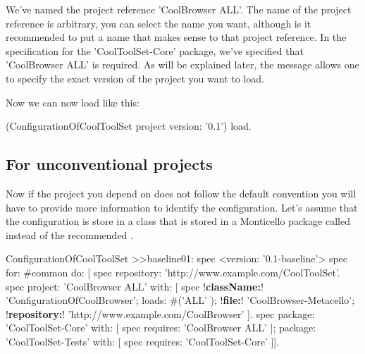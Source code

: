 \documentclass[a4paper,10pt,twoside]{book}
\begin{document}
We've named the project reference 'CoolBrowser ALL'. The name of the project reference is arbitrary, you can select the name you want, although is it recommended to put a name that makes sense to that project reference.  In the specification for the 'CoolToolSet-Core' package, we've specified that 'CoolBrowser ALL' is required. As will be explained later, the message  allows one to specify the exact version of the project you want to load.

Now we can now load  like this:

\begin{code}{}
(ConfigurationOfCoolToolSet project version: '0.1') load.
\end{code}


\subsection{For unconventional projects}

Now if the project you depend on does not follow the default convention you will have to provide more information to identify
the configuration. Let's assume that the configuration is store in a class  that is stored in a Monticello package called  instead of the recommended .


\begin{code}{}
ConfigurationOfCoolToolSet >>baseline01: spec 
       <version: '0.1-baseline'>
       spec for: #common do: [
              spec repository: 'http://www.example.com/CoolToolSet'.
              spec project: 'CoolBrowser ALL' with: [
                            spec 
                                   !\textbf{className:}! 'ConfigurationOfCoolBrowser';
                                   loads: #('ALL' );
                                   !\textbf{file:}! 'CoolBrowser-Metacello';
                                   !\textbf{repository:}! 'http://www.example.com/CoolBrowser' ].
              spec 
                     package: 'CoolToolSet-Core' with: [ spec requires: 'CoolBrowser ALL' ];
                     package: 'CoolToolSet-Tests' with: [ spec requires: 'CoolToolSet-Core' ]].
\end{code}       
\end{document}
